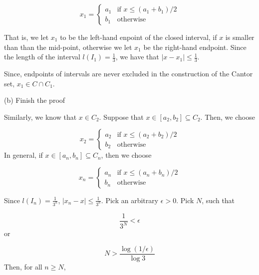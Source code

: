 \documentclass[10pt]{article}
\begin{document}
\begin{equation*}
x_{1} =\begin{cases}
a_{1} & \text{if } x\leq ( a_{1} +b_{1}) /2\\
b_{1} & \text{otherwise}
\end{cases}
\end{equation*}
 

That is, we let $\displaystyle x_{1}$ to be the left-hand enpoint of the closed interval, if $\displaystyle x$ is smaller than than the mid-point, otherwise we let $\displaystyle x_{1}$ be the right-hand endpoint. Since the length of the interval $\displaystyle l( I_{1}) =\frac{1}{3}$, we have that $\displaystyle |x-x_{1} |\leq \frac{1}{3}$.



Since, endpoints of intervals are never excluded in the construction of the Cantor set, $\displaystyle x_{1} \in C\cap C_{1}$.



(b) Finish the proof 

Similarly, we know that $\displaystyle x\in C_{2}$. Suppose that $\displaystyle x\in [ a_{2} ,b_{2}] \subseteq C_{2}$. Then, we choose


\begin{equation*}
x_{2} =\begin{cases}
a_{2} & \text{if } x\leq ( a_{2} +b_{2}) /2\\
b_{2} & \text{otherwise}
\end{cases}
\end{equation*}
In general, if $\displaystyle x\in [ a_{n} ,b_{n}] \subseteq C_{n}$, then we choose


\begin{equation*}
x_{n} =\begin{cases}
a_{n} & \text{if } x\leq ( a_{n} +b_{n}) /2\\
b_{n} & \text{otherwise}
\end{cases}
\end{equation*}


Since $\displaystyle l( I_{n}) =\frac{1}{3^{n}}$, $\displaystyle |x_{n} -x|\leq \frac{1}{3^{n}}$. Pick an arbitrary $\displaystyle \epsilon  >0$. Pick $\displaystyle N$, such that 


\begin{equation*}
\frac{1}{3^{N}} < \epsilon 
\end{equation*}
or


\begin{equation*}
N >\frac{\log( 1/\epsilon )}{\log 3}
\end{equation*}
Then, for all $\displaystyle n\geq N$,
\end{document}

